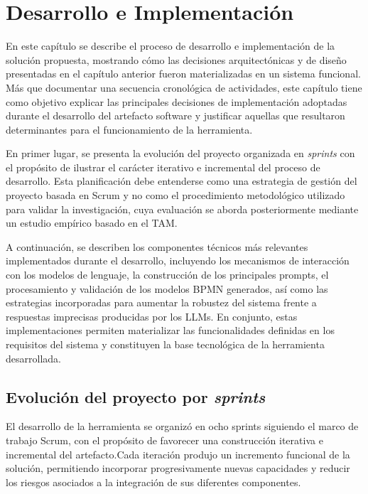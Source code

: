 
\chapter{Desarrollo e Implementación}
\label{cap:desarrollo}

En este capítulo se describe el proceso de desarrollo e implementación de la solución propuesta, mostrando cómo las decisiones arquitectónicas y de diseño presentadas en el capítulo anterior fueron materializadas en un sistema funcional. Más que documentar una secuencia cronológica de actividades, este capítulo tiene como objetivo explicar las principales decisiones de implementación adoptadas durante el desarrollo del artefacto software y justificar aquellas que resultaron determinantes para el funcionamiento de la herramienta.

En primer lugar, se presenta la evolución del proyecto organizada en \textit{sprints} con el propósito de ilustrar el carácter iterativo e incremental del proceso de desarrollo. Esta planificación debe entenderse como una estrategia de gestión del proyecto basada en Scrum y no como el procedimiento metodológico utilizado para validar la investigación, cuya evaluación se aborda posteriormente mediante un estudio empírico basado en el TAM.

A continuación, se describen los componentes técnicos más relevantes implementados durante el desarrollo, incluyendo los mecanismos de interacción con los modelos de lenguaje, la construcción de los principales prompts, el procesamiento y validación de los modelos BPMN generados, así como las estrategias incorporadas para aumentar la robustez del sistema frente a respuestas imprecisas producidas por los LLMs. En conjunto, estas implementaciones permiten materializar las funcionalidades definidas en los requisitos del sistema y constituyen la base tecnológica de la herramienta desarrollada. 


\section{Evolución del proyecto por \textit{sprints}}
\label{sec:evolucionSprints}

El desarrollo de la herramienta se organizó en ocho sprints siguiendo el marco de trabajo Scrum, con el propósito de favorecer una construcción iterativa e incremental del artefacto.Cada iteración produjo un incremento funcional de la solución, permitiendo incorporar progresivamente nuevas capacidades y reducir los riesgos asociados a la integración de sus diferentes componentes.

